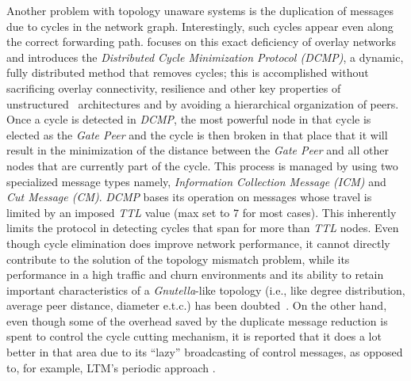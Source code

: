 Another problem with topology unaware
systems is the duplication of messages due to cycles in the network graph.
Interestingly, such cycles appear even along the correct forwarding path.
\cite{ZKB2008} focuses on this exact deficiency of overlay networks and
introduces the \emph{Distributed Cycle Minimization Protocol
(DCMP)}, a dynamic, fully distributed method that removes cycles;
this is accomplished without sacrificing
overlay connectivity, resilience and other key properties of unstructured
\p\ architectures and by avoiding a hierarchical organization of peers. 
Once a cycle is detected in {\it DCMP}, the most powerful node in that cycle 
is elected as the \emph{Gate Peer} and the cycle is then broken in that place
that it will result in the minimization of the distance between the
\emph{Gate Peer} and all other nodes that are currently part of the cycle. 
This process is managed by using two specialized message types 
namely, \emph{Information Collection Message (ICM)} and \emph{Cut Message (CM)}. 
\emph{DCMP} bases its operation on messages whose travel is limited by an
imposed \emph{TTL} value (max set to $7$ for most cases). This inherently limits
the protocol in detecting cycles that span for more than \emph{TTL} nodes.
Even though cycle elimination does improve network performance, 
it cannot  directly contribute to the solution of the topology mismatch
problem, while its performance in a high traffic and churn environments and its
ability to retain important characteristics of a {\sl Gnutella}-like topology (i.e.,
like degree distribution, average peer distance, diameter e.t.c.) has been
doubted~\cite{CSG2010}. 
On the other hand, even though some of the overhead
saved by the duplicate message reduction is spent to control the cycle cutting
mechanism, it is reported that it does a lot better in that area
due to its ``lazy'' broadcasting of control messages, as opposed to, for example,
LTM's periodic approach \cite{ZKB2008}.
%
%
